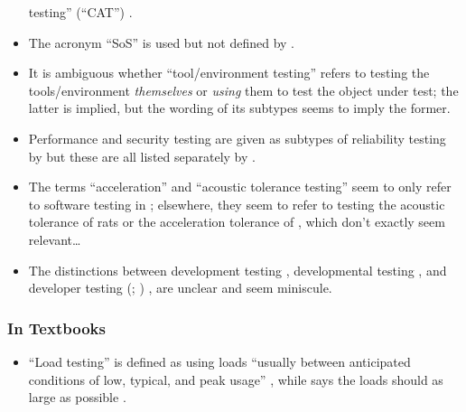 \begin{itemize}
            testing'' (``CAT'') \citep[p.~30]{Firesmith2015}.
      \item The acronym ``SoS'' is used but not defined by
            \citet[p.~23]{Firesmith2015}.
      \item It is ambiguous whether ``tool/environment testing'' refers to
            testing the tools/environment \emph{themselves} or \emph{using}
            them to test the object under test; the latter is implied, but the
            wording of its subtypes \citep[p.~25]{Firesmith2015} seems to imply
            the former.
            \fi
      \item Performance and security testing are given as subtypes of
            reliability testing by \citep{ISO_IEC2023a} but
            these are all listed separately by \citet[p.~53]{Firesmith2015}.
            \ifnotpaper
      \item The terms ``acceleration'' and ``acoustic tolerance testing'' seem
            to only refer to software testing in \citep[p.~56]{Firesmith2015};
            elsewhere, they seem to refer to testing the acoustic tolerance of
            rats \citep{HolleyEtAl1996} or the acceleration tolerance of
            \accelTolTest{}, which don't exactly seem relevant\dots
            \fi
      \item The distinctions between development testing \citep[p.~136]{IEEE2017},
            developmental testing \citep[p.~30]{Firesmith2015}, and developer
            testing
            \ifnotpaper
                  (\citealp[p.~39]{Firesmith2015}; \citealp[p.~11]{Gerrard2000a})
            \else
                  \cite[p.~39]{Firesmith2015}, \cite[p.~11]{Gerrard2000a}
            \fi are unclear and seem miniscule.
\end{itemize}

\ifnotpaper
      \subsubsection{In Textbooks}

      \begin{itemize}
            \item ``Load testing'' is defined as using loads ``usually between
                  anticipated conditions of low, typical, and peak usage''
                  \citep[p.~5]{IEEE2022}, while \citeauthor{Patton2006} says the
                  loads should as large as possible \citeyearpar[p.~86]{Patton2006}.
      \end{itemize}
\fi

